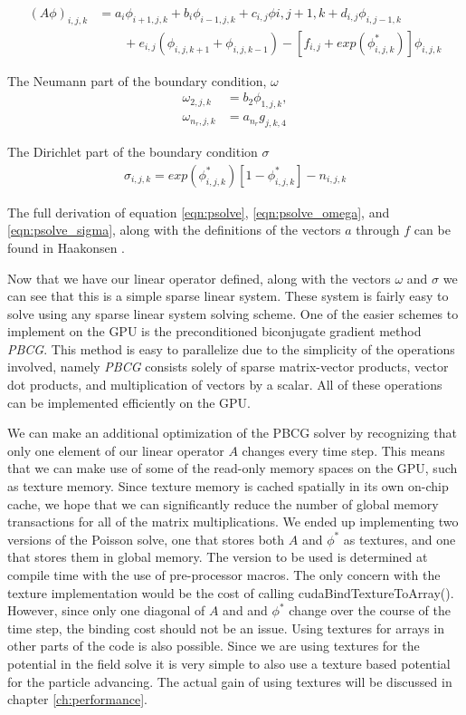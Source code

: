 \begin{align}
(A\phi)_{i,j,k} &= a_{i}\phi_{i+1,j,k}
		  +b_{i}\phi_{i-1,j,k}
		  +c_{i,j}\phi{i,j+1,k}
		  +d_{i,j}\phi_{i,j-1,k} \nonumber \\
		  &\qquad{} +e_{i,j}(\phi_{i,j,k+1}+\phi_{i,j,k-1})
		  -[f_{i,j} + exp(\phi_{i,j,k}^*)]\phi_{i,j,k}
\label{eqn:psolve}
\end{align}

The Neumann part of the boundary condition, $\omega$
\begin{align}
\omega_{2,j,k} &= b_2\phi_{1,j,k},\nonumber \\
\omega_{n_r,j,k} &= a_{n_r}g_{j,k,4}
\label{eqn:psolve_omega}
\end{align}

The Dirichlet part of the boundary condition $\sigma$
\begin{align}
\sigma_{i,j,k} = exp(\phi_{i,j,k}^*)[1-\phi_{i,j,k}^*]-n_{i,j,k}
\label{eqn:psolve_sigma}
\end{align}

The full derivation of equation \ref{eqn:psolve}, \ref{eqn:psolve_omega}, and \ref{eqn:psolve_sigma}, along with the definitions of the vectors $a$ through $f$ can be found in Haakonsen \cite{Haakonsen2011}.

Now that we have our linear operator defined, along with the vectors $\omega$ and $\sigma$ we can see that this is a simple sparse linear system. These system is fairly easy to solve using any sparse linear system solving scheme. One of the easier schemes to implement on the GPU is the preconditioned biconjugate gradient method \emph{PBCG}. This method is easy to parallelize due to the simplicity of the operations involved, namely \emph{PBCG} consists solely of sparse matrix-vector products, vector dot products, and multiplication of vectors by a scalar. All of these operations can be implemented efficiently on the GPU. 

We can make an additional optimization of the PBCG solver by recognizing that only one element of our linear operator $A$ changes every time step. This means that we can make use of some of the read-only memory spaces on the GPU, such as texture memory. Since texture memory is cached spatially in its own on-chip cache, we hope that we can significantly reduce the number of global memory transactions for all of the matrix multiplications. We ended up implementing two versions of the Poisson solve, one that stores both $A$ and $\phi^*$ as textures, and one that stores them in global memory. The version to be used is determined at compile time with the use of pre-processor macros. 
The only concern with the texture implementation would be the cost of calling cudaBindTextureToArray(). However, since only one diagonal of $A$ and and $\phi^*$ change over the course of the time step, the binding cost should not be an issue. Using textures for arrays in other parts of the code is also possible. Since we are using textures for the potential in the field solve it is very simple to also use a texture based potential for the particle advancing. The actual gain of using textures will be discussed in chapter \ref{ch:performance}.

